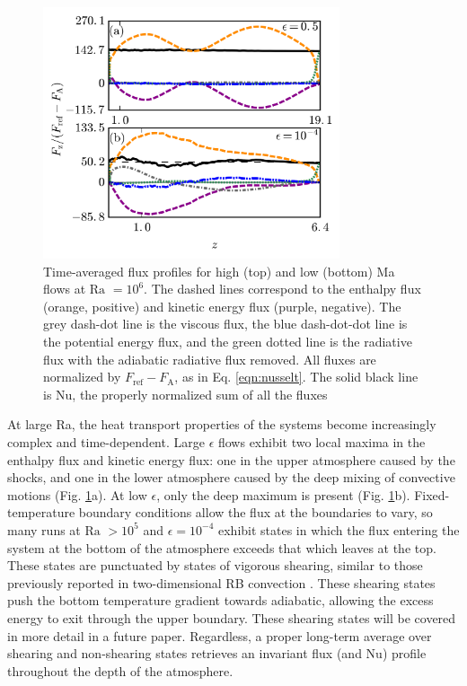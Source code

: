 \documentclass[aps, prl, twocolumn, nofootinbib, groupedaddress, amsfonts, amssymb, amsmath]{revtex4-1}
\begin{document}
\begin{figure}[t]
\includegraphics[width=3.4375in]{./figs/fluxes_fig.png}
\caption{Time-averaged flux profiles for high (top) and low (bottom) Ma flows at $\text{Ra }= 10^6$.  
The dashed lines correspond to the
enthalpy flux (orange, positive) and kinetic energy flux (purple, negative).  The grey dash-dot line is the
viscous flux, the blue dash-dot-dot line is the potential energy flux, 
and the green dotted line is the radiative flux with the adiabatic radiative flux removed. All
fluxes are normalized by $F_{\text{ref}} - F_{\text{A}}$, as in Eq. \ref{eqn:nusselt}.  The solid black line is
Nu, the properly normalized sum of all the fluxes \label{fig:flux_profiles} }
\end{figure}

At large Ra, the heat transport properties of the systems become increasingly complex and time-dependent.
Large $\epsilon$ flows exhibit two local maxima in the enthalpy flux and kinetic energy flux: one in the upper 
atmosphere caused by the shocks, and one in the lower atmosphere caused by the deep mixing of convective motions
(Fig. \ref{fig:flux_profiles}a).
At low $\epsilon$, only the deep maximum is present (Fig. \ref{fig:flux_profiles}b).  
Fixed-temperature boundary conditions allow the flux at the boundaries to vary, so many runs at $\text{Ra }> 10^5$
and $\epsilon = 10^{-4}$ exhibit states in which the flux entering the system at the bottom of the atmosphere 
exceeds that which leaves at the top.  
These states are punctuated by states of vigorous shearing, similar to those previously
reported in two-dimensional RB convection \cite{goluskin&all2014}.  These shearing states push the bottom temperature
gradient towards adiabatic, allowing the excess energy to exit through the upper boundary.  These shearing
states will be covered in more detail in a future paper.  Regardless, a proper long-term average over shearing
and non-shearing states retrieves an invariant flux (and Nu) profile throughout the depth
of the atmosphere. 
\end{document}
